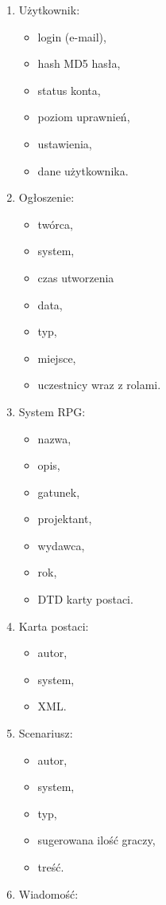 \begin{enumerate}
\item Użytkownik:
	\begin{itemize}
	\item login (e-mail),
	\item hash MD5 hasła,
	\item status konta,
	\item poziom uprawnień,
	\item ustawienia,
	\item dane użytkownika.
	\end{itemize}
\item Ogłoszenie:
	\begin{itemize}
	\item twórca,
	\item system,
	\item czas utworzenia
	\item data,
	\item typ,
	\item miejsce,
	\item uczestnicy wraz z rolami.
	\end{itemize}
\item System RPG:
	\begin{itemize}
	\item nazwa,
	\item opis,
	\item gatunek,
	\item projektant,
	\item wydawca,
	\item rok,
	\item DTD karty postaci.
	\end{itemize}
\item Karta postaci:
	\begin{itemize}
	\item autor,
	\item system,
	\item XML.
	\end{itemize}
\item Scenariusz:
	\begin{itemize}
	\item autor,
	\item system,
	\item typ,
	\item sugerowana ilość graczy,
	\item treść.
	\end{itemize}
\item Wiadomość:
	\begin{itemize}

\end{itemize}
\end{enumerate}

